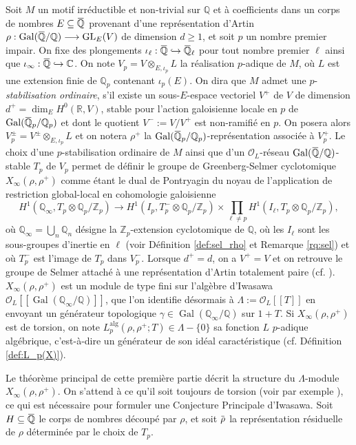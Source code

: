 \documentclass[12pt]{amsart}
\newcommand\bR{\mathbb{R}}
\newcommand\bC{\mathbb{C}}
\newcommand\bQ{\mathbb{Q}}
\newcommand\Zp{{\mathbb{Z}_{p}}}
\newcommand\Qp{\mathbb{Q}_{p}}
\newcommand\cO{\mathcal{O}}
\newcommand{\ob}[1]{\mkern 1.5mu\overline{\mkern-1.5mu#1\mkern-1.5mu}\mkern 1.5mu}
\newcommand{\alg}{\textrm{alg}}
\DeclareMathOperator{\Gal}{Gal}
\DeclareMathOperator{\GL}{GL}
\theoremstyle{defstyle}
\theoremstyle{thmstyle}
\begin{document}
Soit $M$ un motif irréductible et non-trivial sur $\bQ$ et à coefficients dans un corps de nombres $E \subseteq \ob{\bQ}$ provenant d'une représentation d'Artin $\rho : \Gal(\ob{\bQ}/\bQ) \longrightarrow \GL_E(V)$ de dimension $d\geq 1$, et soit $p$ un nombre premier impair. On fixe des plongements $\iota_\ell : \ob{\bQ} \hookrightarrow \ob{\bQ}_\ell$ pour tout nombre premier $\ell$ ainsi que $\iota_\infty : \ob{\bQ} \hookrightarrow \bC$. On note $V_p = V \otimes_{E,\iota_p} L$ la réalisation $p$-adique de $M$, où $L$ est une extension finie de $\Qp$ contenant $\iota_p(E)$. On dira que $M$ admet une $p$-\textit{stabilisation ordinaire}, s'il existe un sous-$E$-espace vectoriel $V^+$ de $V$ de dimension $d^+=\dim_E H^0(\bR,V)$, stable pour l'action galoisienne locale en $p$ de $\Gal(\ob{\bQ}_p/\bQ_p)$ et dont le quotient $V^-:=V/V^+$ est non-ramifié en $p$. On posera alors $V_p^\pm = V^\pm \otimes_{E,\iota_p} L$ et on notera $\rho^+$ la $\Gal(\ob{\bQ}_p/\Qp)$-représentation associée à $V_p^+$. Le choix d'une $p$-stabilisation ordinaire de $M$ ainsi que d'un $\cO_L$-réseau $\Gal(\ob{\bQ}/\bQ)$-stable $T_p$ de $V_p$ permet de définir le groupe de Greenberg-Selmer cyclotomique $X_\infty(\rho,\rho^+)$ comme étant le dual de Pontryagin du noyau de l'application de restriction global-local en cohomologie galoisienne
$$ H^1(\bQ_\infty,T_p \otimes \Qp/\Zp) \longrightarrow H^1(I_{p},T^-_p \otimes \Qp/\Zp) \times \prod_{\ell \neq p} H^1(I_{\ell},T_p \otimes \Qp/\Zp), $$
où $\bQ_\infty=\bigcup_n \bQ_n$ désigne la $\Zp$-extension cyclotomique de $\bQ$, où les $I_\ell$ sont les sous-groupes d'inertie en $\ell$ (voir Définition \ref{def:sel_rho} et Remarque \ref{rq:sel}) et où $T_p^-$ est l'image de $T_p$ dans $V_p^-$. Lorsque $d^+=d$, on a $V^+=V$ et on retrouve le groupe de Selmer attaché à une représentation d'Artin totalement paire (cf. \cite{greenbergartinII}). $X_\infty(\rho,\rho^+)$ est un module de type fini sur l'algèbre d'Iwasawa $\cO_L[[\Gal(\bQ_\infty/\bQ)]]$, que l'on identifie désormais à $\Lambda:=\cO_L[[T]]$ en envoyant un générateur topologique $\gamma\in\Gal(\bQ_\infty/\bQ)$ sur $1+T$. Si $X_\infty(\rho,\rho^+)$ est de torsion, on note $L_p^{\alg}(\rho,\rho^+;T) \in \Lambda-\{0\}$ sa fonction $L$ $p$-adique algébrique, c'est-à-dire un générateur de son idéal caractéristique (cf. Définition \ref{def:L_p(X)}).

Le théorème principal de cette première partie décrit la structure du $\Lambda$-module $X_\infty(\rho,\rho^+)$. On s'attend à ce qu'il soit toujours de torsion (voir par exemple \cite[Conjecture 3.3]{greenbergdeformation}), ce qui est nécessaire pour formuler une Conjecture Principale d'Iwasawa. Soit $H\subseteq \ob{\bQ}$ le corps de nombres découpé par $\rho$, et soit $\ob{\rho}$ la représentation résiduelle de $\rho$ déterminée par le choix de $T_p$.
\end{document}
